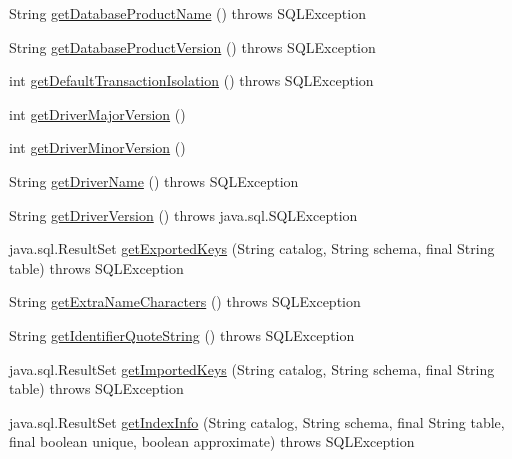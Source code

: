 \begin{DoxyCompactItemize}
\item 
String \mbox{\hyperlink{classcom_1_1mysql_1_1cj_1_1jdbc_1_1_database_meta_data_a3374d9a87f1634e8ef4daade5e30b3a4}{get\+Database\+Product\+Name}} ()  throws S\+Q\+L\+Exception 
\item 
String \mbox{\hyperlink{classcom_1_1mysql_1_1cj_1_1jdbc_1_1_database_meta_data_a995acc5e9c96624f5b8fbac391a53855}{get\+Database\+Product\+Version}} ()  throws S\+Q\+L\+Exception 
\item 
int \mbox{\hyperlink{classcom_1_1mysql_1_1cj_1_1jdbc_1_1_database_meta_data_a7cc0b9e70f46a984306115eae9c08794}{get\+Default\+Transaction\+Isolation}} ()  throws S\+Q\+L\+Exception 
\item 
int \mbox{\hyperlink{classcom_1_1mysql_1_1cj_1_1jdbc_1_1_database_meta_data_a80f700598836ec9d9b8c94fa2baffb36}{get\+Driver\+Major\+Version}} ()
\item 
int \mbox{\hyperlink{classcom_1_1mysql_1_1cj_1_1jdbc_1_1_database_meta_data_a177a5feff862a3f8bd01d19f5ac3f60b}{get\+Driver\+Minor\+Version}} ()
\item 
String \mbox{\hyperlink{classcom_1_1mysql_1_1cj_1_1jdbc_1_1_database_meta_data_aef7cd8cc269e90ceee25e645f9e37f68}{get\+Driver\+Name}} ()  throws S\+Q\+L\+Exception 
\item 
String \mbox{\hyperlink{classcom_1_1mysql_1_1cj_1_1jdbc_1_1_database_meta_data_ae8ee990a19bf7059831d95561dfdc558}{get\+Driver\+Version}} ()  throws java.\+sql.\+S\+Q\+L\+Exception 
\item 
java.\+sql.\+Result\+Set \mbox{\hyperlink{classcom_1_1mysql_1_1cj_1_1jdbc_1_1_database_meta_data_a24b648e8b0b81c2e103969a7cb38e60f}{get\+Exported\+Keys}} (String catalog, String schema, final String table)  throws S\+Q\+L\+Exception 
\item 
String \mbox{\hyperlink{classcom_1_1mysql_1_1cj_1_1jdbc_1_1_database_meta_data_a83cc190b4e0df20ef2aabe38bf08985c}{get\+Extra\+Name\+Characters}} ()  throws S\+Q\+L\+Exception 
\item 
String \mbox{\hyperlink{classcom_1_1mysql_1_1cj_1_1jdbc_1_1_database_meta_data_a4ad3801251fbf252463d6f02c0af30ac}{get\+Identifier\+Quote\+String}} ()  throws S\+Q\+L\+Exception 
\item 
java.\+sql.\+Result\+Set \mbox{\hyperlink{classcom_1_1mysql_1_1cj_1_1jdbc_1_1_database_meta_data_adc8fcceec522ea001113c716efd56c16}{get\+Imported\+Keys}} (String catalog, String schema, final String table)  throws S\+Q\+L\+Exception 
\item 
java.\+sql.\+Result\+Set \mbox{\hyperlink{classcom_1_1mysql_1_1cj_1_1jdbc_1_1_database_meta_data_a8df3107197ea5040b71532d8de238736}{get\+Index\+Info}} (String catalog, String schema, final String table, final boolean unique, boolean approximate)  throws S\+Q\+L\+Exception 

\end{DoxyCompactItemize}
